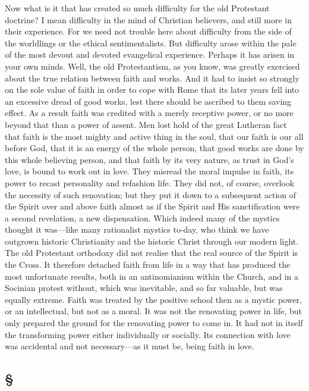 \documentclass[draft]{ptfdoc}
\begin{document}
Now what is it that has created so much difficulty 
for the old Protestant doctrine? I mean 
difficulty in the mind of Christian believers, and 
still more in their experience. For we need not 
trouble here about difficulty from the side of the 
worldlings or the ethical sentimentalists. But 
difficulty arose within the pale of the most 
devout and devoted evangelical experience. 
Perhaps it has arisen in your own minds. Well, 
the old Protestantism, as you know, was greatly 
exercised about the true relation between faith 
and works. And it had to insist so strongly on 
the sole value of faith in order to cope with 
Rome that its later years fell into an excessive 
dread of good works, lest there should be 
ascribed to them saving effect. As a result faith 
was credited with a merely receptive power, or 
no more beyond that than a power of assent. 
Men lost hold of the great Lutheran fact that 
faith is the most mighty and active thing in the 
soul, that our faith is our all before God, that it 
is an energy of the whole person, that good 
works are done by this whole believing person, 
and that faith by its very nature, as trust in God's 
love, is bound to work out in love. They misread 
the moral impulse in faith, its power to 
recast personality and refashion life. They did 
not, of course, overlook the necessity of such 
renovation; but they put it down to a subsequent 
action of the Spirit over and above faith 
almost as if the Spirit and His sanctification were 
a second revelation, a new dispensation. Which 
indeed many of the mystics thought it was---like 
many rationalist mystics to-day, who think we 
have outgrown historic Christianity and the 
historic Christ through our modern light. The 
old Protestant orthodoxy did not realise that the 
real source of the Spirit is the Cross. It therefore 
detached faith from life in a way that has produced 
the most unfortunate results, both in an 
antinomianism within the Church, and in a 
Socinian protest without, which was inevitable, 
and so far valuable, but was equally extreme. 
Faith was treated by the positive school then as a 
mystic power, or an intellectual, but not as a 
moral. It was not the renovating power in life, 
but only prepared the ground for the renovating 
power to come in. It had not in itself the transforming 
power either individually or socially. 
Its connection with love was accidental and not 
necessary---as it must be, being faith in love. 

\subsection*{
\S
}
\end{document}
